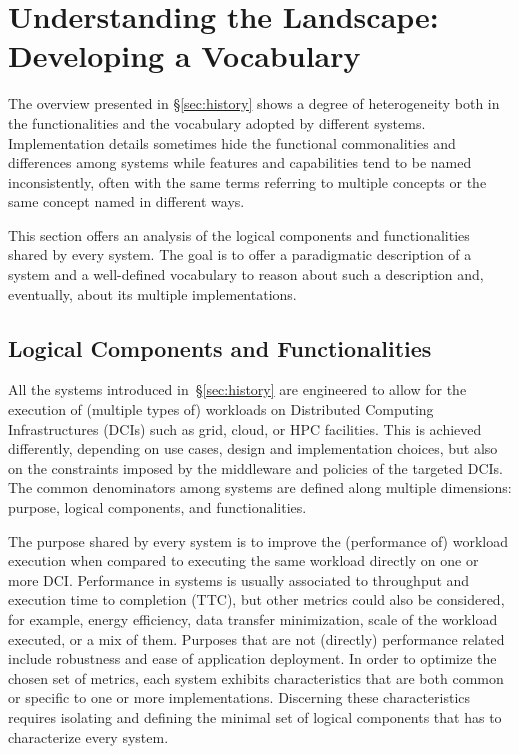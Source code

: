 \documentclass{sig-alternate}
\begin{document}
\section{Understanding the Landscape: Developing a Vocabulary}
\label{sec:understanding}

The overview presented in \S\ref{sec:history} shows a degree of heterogeneity
both in the functionalities and the vocabulary adopted by different \pilot
systems. Implementation details sometimes hide the functional commonalities and
differences among \pilot systems while features and capabilities tend to be
named inconsistently, often with the same terms referring to multiple concepts
or the same concept named in different ways.

This section offers an analysis of the logical components and functionalities
shared by every \pilot system. The goal is to offer a paradigmatic description
of a \pilot system and a well-defined vocabulary to reason about such a
description and, eventually, about its multiple implementations.

\subsection{Logical Components and Functionalities}
\label{sec:compsandfuncs}

All the \pilot systems introduced in~\S\ref{sec:history} are engineered to
allow for the execution of (multiple types of) workloads on Distributed
Computing Infrastructures (DCIs) such as grid, cloud, or HPC facilities. This
is achieved differently, depending on use cases, design and implementation
choices, but also on the constraints imposed by the middleware and policies of
the targeted DCIs. The common denominators among \pilot systems are defined
along multiple dimensions: purpose, logical components, and functionalities.

The purpose shared by every \pilot system is to improve the (performance of)
workload execution when compared to executing the same workload directly on one
or more DCI. Performance in \pilot systems is usually associated to throughput
and execution time to completion (TTC), but other metrics could also be
considered, for example, energy efficiency, data transfer minimization, scale
of the workload executed, or a mix of them. Purposes that are not (directly)
performance related include robustness and ease of application deployment.  In
order to optimize the chosen set of metrics, each \pilot system exhibits
characteristics that are both common or specific to one or more
implementations. Discerning these characteristics requires isolating and
defining the minimal set of logical components that has to characterize every
\pilot system.
\end{document}

